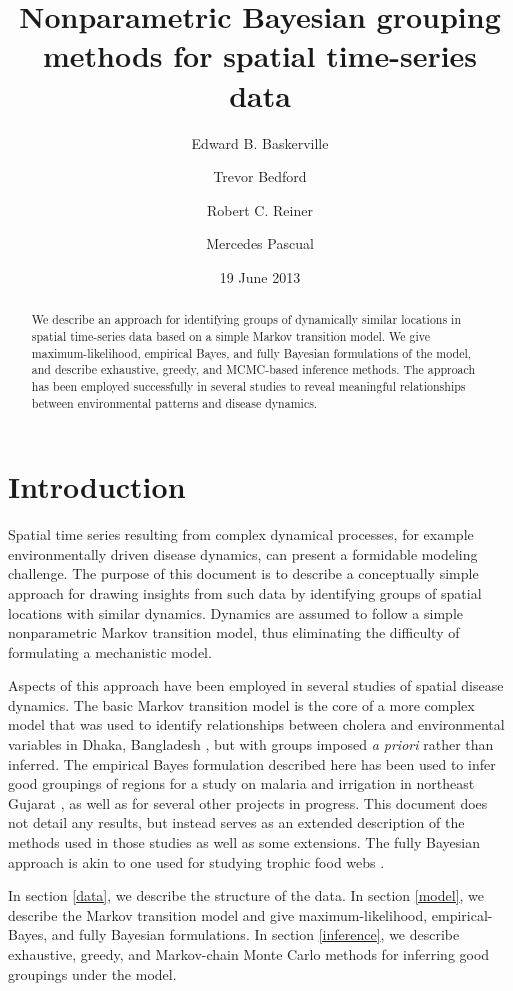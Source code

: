 \documentclass[12pt]{article}
\title{\large \bf Nonparametric Bayesian grouping methods for spatial time-series data}
\author[1]{\normalsize Edward B. Baskerville}
\author[2]{\normalsize Trevor Bedford}
\author[3]{\normalsize Robert C. Reiner}
\author[1,4]{\normalsize Mercedes Pascual}
\affil[1]{\small Department of Ecology \& Evolutionary Biology, University of Michigan}
\affil[2]{\small Institute of Evolutionary Biology, University of Edinburgh}
\affil[3]{\small University of California, Davis; Fogarty International Center, National Institutes of Health}
\affil[4]{\small Howard Hughes Medical Institute}
\date{\normalsize 19 June 2013}
\begin{document}
\maketitle

\normalsize \begin{abstract}

\noindent We describe an approach for identifying groups of dynamically similar locations in spatial time-series data based on a simple Markov transition model. We give maximum-likelihood, empirical Bayes, and fully Bayesian formulations of the model, and describe exhaustive, greedy, and MCMC-based inference methods. The approach has been employed successfully in several studies to reveal meaningful relationships between environmental patterns and disease dynamics.

\end{abstract}

\section{Introduction}
\label{intro}

Spatial time series resulting from complex dynamical processes, for example environmentally driven disease dynamics, can present a formidable modeling challenge. The purpose of this document is to describe a conceptually simple approach for drawing insights from such data by identifying groups of spatial locations with similar dynamics. Dynamics are assumed to follow a simple nonparametric Markov transition model, thus eliminating the difficulty of formulating a mechanistic model.

Aspects of this approach have been employed in several studies of spatial disease dynamics. The basic Markov transition model is the core of a more complex model that was used to identify relationships between cholera and environmental variables in Dhaka, Bangladesh \cite{reiner2012}, but with groups imposed \emph{a priori} rather than inferred. The empirical Bayes formulation described here has been used to infer good groupings of regions for a study on malaria and irrigation in northeast Gujarat \cite{baeza2013}, as well as for several other projects in progress. This document does not detail any results, but instead serves as an extended description of the methods used in those studies as well as some extensions. The fully Bayesian approach is akin to one used for studying trophic food webs \cite{baskerville2011}.

In section \ref{data}, we describe the structure of the data. In section \ref{model}, we describe the Markov transition model and give maximum-likelihood, empirical-Bayes, and fully Bayesian formulations. In section \ref{inference}, we describe exhaustive, greedy, and Markov-chain Monte Carlo methods for inferring good groupings under the model.
\end{document}
